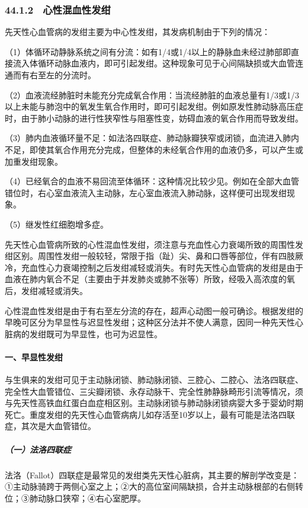 \subsubsection{44.1.2　心性混血性发绀}

先天性心血管病的发绀主要为中心性发绀，其发病机制由于下列的情况：

（1）体循环动静脉系统之间有分流：如有1/4或1/4以上的静脉血未经过肺部即直接流入体循环动脉血液内，即可引起发绀。这种现象可见于心间隔缺损或大血管连通而有右至左的分流时。

（2）血液流经肺脏时未能充分完成氧合作用：当流经肺脏的血液总量有1/3或1/3以上未能与肺泡中的氧发生氧合作用时，即可引起发绀。例如原发性肺动脉高压症时，由于肺小动脉的进行性狭窄性与阻塞性变，妨碍血液的氧合作用而导致发绀。

（3）肺内血液循环量不足：如法洛四联症、肺动脉瓣狭窄或闭锁，血流进入肺内不足，即使其氧合作用充分完成，但整体的未经氧合作用的血液仍多，可以产生或加重发绀现象。

（4）已经氧合的血液不易回流至体循环：这种情况比较少见。例如在全部大血管错位时，右心室血液流入主动脉，左心室血液流入肺动脉，这样便可出现发绀现象。

（5）继发性红细胞增多症。

先天性心血管病所致的心性混血性发绀，须注意与充血性心力衰竭所致的周围性发绀区别。周围性发绀一般较轻，常限于指（趾）尖、鼻和口唇等部位，伴有四肢厥冷，充血性心力衰竭控制之后发绀减轻或消失。有时先天性心血管病的发绀是由于血液在肺内氧合不足（主要由于并发肺炎或肺不张等）所致，经吸入高浓度的氧后，发绀减轻或消失。

心性混血性发绀是由于有右至左分流的存在，超声心动图一般可确诊。根据发绀的早晚可区分为早显性与迟显性发绀；这种区分法并不使人满意，因同一种先天性心脏病的发绀既可为早显性，也可为迟显性。

\paragraph{一、早显性发绀}

与生俱来的发绀可见于主动脉闭锁、肺动脉闭锁、三腔心、二腔心、法洛四联症、完全性大血管错位、三尖瓣闭锁、永存动脉干、完全性肺静脉畸形引流等情况，须与先天性高铁血红蛋白血症相区别。主动脉闭锁与肺动脉闭锁病婴大多于婴幼时期死亡。重度发绀的先天性心血管病病儿如存活至10岁以上，最有可能是法洛四联症，其次是大血管错位。

\subparagraph{（一）法洛四联症}

法洛（Fallot）四联症是最常见的发绀类先天性心脏病，其主要的解剖学改变是：①主动脉骑跨于两侧心室之上；②大的高位室间隔缺损，合并主动脉根部的右侧转位；③肺动脉口狭窄；④右心室肥厚。

